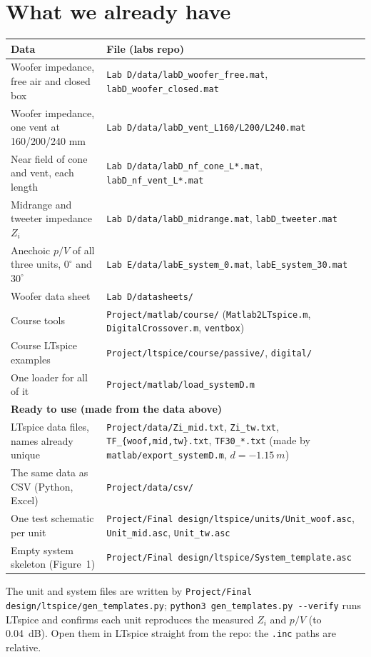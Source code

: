 \documentclass[a4paper,10pt]{article}
\newcommand{\file}[1]{\nolinkurl{#1}}
\newcommand{\cmd}[1]{\texttt{#1}}   %
\begin{document}
\section*{What we already have}
\begin{tabularx}{\linewidth}{lX}
\toprule
Data & File (labs repo) \\
\midrule
Woofer impedance, free air and closed box & \file{Lab D/data/labD_woofer_free.mat}, \file{labD_woofer_closed.mat} \\
Woofer impedance, one vent at 160/200/240 mm & \file{Lab D/data/labD_vent_L160/L200/L240.mat} \\
Near field of cone and vent, each length & \file{Lab D/data/labD_nf_cone_L*.mat}, \file{labD_nf_vent_L*.mat} \\
Midrange and tweeter impedance $Z_i$ & \file{Lab D/data/labD_midrange.mat}, \file{labD_tweeter.mat} \\
Anechoic $p/V$ of all three units, $0^\circ$ and $30^\circ$ & \file{Lab E/data/labE_system_0.mat}, \file{labE_system_30.mat} \\
Woofer data sheet & \file{Lab D/datasheets/} \\
Course tools & \file{Project/matlab/course/} (\file{Matlab2LTspice.m}, \file{DigitalCrossover.m}, \file{ventbox}) \\
Course LTspice examples & \file{Project/ltspice/course/passive/}, \file{digital/} \\
One loader for all of it & \file{Project/matlab/load_systemD.m} \\
\midrule
\multicolumn{2}{l}{\textbf{Ready to use (made from the data above)}} \\
LTspice data files, names already unique & \file{Project/data/Zi_mid.txt}, \file{Zi_tw.txt}, \file{TF_\{woof,mid,tw\}.txt},
  \file{TF30_*.txt} (made by \file{matlab/export_systemD.m}, $d = \SI{-1.15}{m}$) \\
The same data as CSV (Python, Excel) & \file{Project/data/csv/} \\
One test schematic per unit & \cmd{Project/Final design/ltspice/units/Unit\_woof.asc}, \file{Unit_mid.asc}, \file{Unit_tw.asc} \\
Empty system skeleton (Figure~1) & \cmd{Project/Final design/ltspice/System\_template.asc} \\
\bottomrule
\end{tabularx}

The unit and system files are written by \cmd{Project/Final design/ltspice/gen\_templates.py};
\file{python3 gen_templates.py --verify} runs LTspice and confirms each unit reproduces the
measured $Z_i$ and $p/V$ (to \SI{0.04}{dB}). Open them in LTspice straight from the repo:
the \file{.inc} paths are relative.
\end{document}
